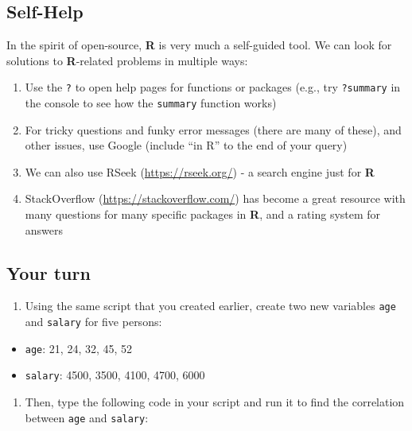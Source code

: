 \documentclass[]{book}
\providecommand{\tightlist}{%
  \setlength{\itemsep}{0pt}\setlength{\parskip}{0pt}}
\begin{document}
\hypertarget{self-help}{%
\subsection{Self-Help}\label{self-help}}

In the spirit of open-source, \textbf{R} is very much a self-guided tool. We can look for solutions to \textbf{R}-related problems in multiple ways:

\begin{enumerate}
\def\labelenumi{\arabic{enumi}.}
\item
  Use the \texttt{?} to open help pages for functions or packages (e.g., try \texttt{?summary} in the console to see how the \texttt{summary} function works)
\item
  For tricky questions and funky error messages (there are many of these), and other issues, use Google (include ``in R'' to the end of your query)
\item
  We can also use RSeek (\url{https://rseek.org/}) - a search engine just for \textbf{R}
\item
  StackOverflow (\url{https://stackoverflow.com/}) has become a great resource with many questions for many specific packages in \textbf{R}, and a rating system for answers
\end{enumerate}

\hypertarget{your-turn-1}{%
\subsection{Your turn}\label{your-turn-1}}

\begin{enumerate}
\def\labelenumi{\arabic{enumi}.}
\tightlist
\item
  Using the same script that you created earlier, create two new variables \texttt{age} and \texttt{salary} for five persons:
\end{enumerate}

\begin{itemize}
\tightlist
\item
  \texttt{age}: 21, 24, 32, 45, 52
\item
  \texttt{salary}: 4500, 3500, 4100, 4700, 6000
\end{itemize}

\begin{enumerate}
\def\labelenumi{\arabic{enumi}.}
\setcounter{enumi}{1}
\tightlist
\item
  Then, type the following code in your script and run it to find the correlation between \texttt{age} and \texttt{salary}:
\end{enumerate}
\end{document}
